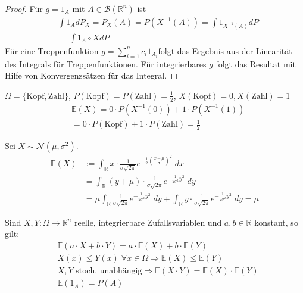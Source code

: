 \begin{proof}
Für $g = 1_A$ mit $A \in \mathcal{B}(\mathbb{R}^n)$ ist
\begin{align*}
& \int 1_A dP_X = P_X(A) = P(X^{-1} (A)) = \int 1_{X^{-1}(A)} dP \\
&= \int 1_{A} \circ X dP
\end{align*}
Für eine Treppenfunktion $g= \sum_{i= 1}^n c_i 1_{A_i} $folgt das Ergebnis aus der Linearität des Integrals für Treppenfunktionen. Für integrierbares $g$ folgt das Resultat mit Hilfe von Konvergenzsätzen für das  Integral.
\end{proof}



\begin{Beispiel}
$\Omega = \{ \text{Kopf},\text{Zahl}\}$, $P(\text{Kopf}) = P(\text{Zahl}) = \frac{1}{2}$, $X(\text{Kopf}) = 0,  X(\text{Zahl}) = 1$ 
\begin{align*}
& \mathbb{E}(X)  = 0 \cdot P(X^{-1}(0) ) + 1 \cdot P(X^{-1}(1)) \\
& =0  \cdot P(\text{Kopf}) + 1 \cdot P(\text{Zahl}) = \frac{1}{2}  
\end{align*}
\end{Beispiel}

\begin{Beispiel}
Sei $X \sim \mathcal{N}(\mu, \sigma^2)$.
\begin{align*}
\mathbb{E}(X) & := \int_{\mathbb{R}}  x \cdot  \frac 1{\sigma \sqrt{2\pi}}e^{- \frac {1}{2 } (\frac{x- \mu}{ \sigma})^2} \; dx  \\
&= \int_{\mathbb{R}}  (y + \mu) \cdot  \frac 1{\sigma \sqrt{2\pi}}e^{- \frac {1}{2 \sigma^2} y^2} \; dy \\
 &  = \mu  \int_{\mathbb{R}}      \frac 1{\sigma \sqrt{2\pi}}e^{- \frac {1}{2 \sigma^2} y^2} \; dy  + \int_{\mathbb{R}}  y  \cdot  \frac 1{\sigma \sqrt{2\pi}}e^{- \frac {1}{2 \sigma^2} y^2} \; dy = \mu
\end{align*}
\end{Beispiel}

\begin{Satz}
Sind $X,Y : \Omega \to \mathbb{R}^n$   reelle, integrierbare  Zufallsvariablen und $a,b \in \mathbb{R}$ konstant, so gilt:
\begin{align*}
& \mathbb{E}(a \cdot X + b \cdot Y) = a \cdot \mathbb{E}(X) + b \cdot \mathbb{E}(Y) \\
& X(x) \leq Y(x) \;  \forall x \in \Omega \Rightarrow \mathbb{E}(X) \leq \mathbb{E}(Y) \\
& X ,Y \text{ stoch. unabhängig} \Rightarrow   \mathbb{E}(X \cdot Y) =  \mathbb{E}(X) \cdot  \mathbb{E}(Y) \\
& \mathbb{E} (1_A) = P (A)
\end{align*}
\end{Satz}

